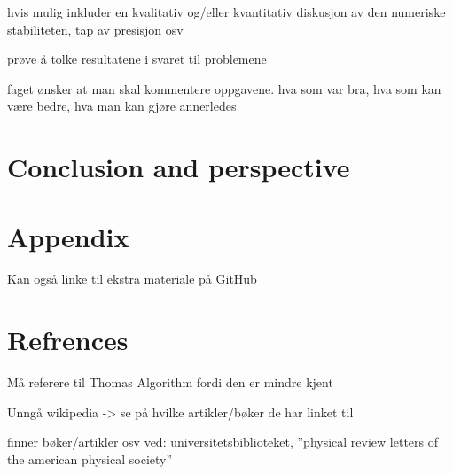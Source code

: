 \documentclass{article}
\begin{document}
  hvis mulig inkluder en kvalitativ og/eller kvantitativ diskusjon av den numeriske stabiliteten, tap av presisjon osv

  prøve å tolke resultatene i svaret til problemene

  faget ønsker at man skal kommentere oppgavene. hva som var bra, hva som kan være bedre, hva man kan gjøre annerledes


\vspace{1cm}

\section{Conclusion and perspective}






\vspace{1cm}

\section{Appendix}

  Kan også linke til ekstra materiale på GitHub





\vspace{1cm}

\section{Refrences}

  Må referere til Thomas Algorithm fordi den er mindre kjent

  Unngå wikipedia -> se på hvilke artikler/bøker de har linket til

  finner bøker/artikler osv ved: universitetsbiblioteket, ''physical review letters of the american physical society''




\end{document}
